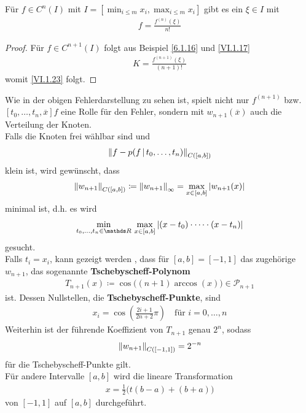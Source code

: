\begin{Fole}
  Für $f\in C^n(I) $ mit $I=[\min_{i\leq m}x_i, \max_{i\leq m}x_i]$
  gibt es ein $\xi\in I$ mit 
  \begin{gather}
    [t_0,\dots,t_n]f=\frac{f^{(n)}(\xi)}{n!}
    \label{VI.1.23}
  \end{gather}

  \begin{proof}
    Für $f\in C^{n+1}(I)$ folgt aus
    Beispiel \ref{6.1.16} und \eqref{VI.1.17}
    \begin{gather*}
      K= \frac{f^{(n+1)}(\xi)}{(n+1)!}
    \end{gather*}
    womit \eqref{VI.1.23} folgt.
  \end{proof}
\end{Fole}

Wie in der obigen Fehlerdarstellung zu sehen ist,
spielt nicht nur $f^{(n+1)}$ bzw.
$[t_0,\dots,t_n, \overline{x}]f$ eine Rolle für den Fehler,
sondern mit $w_{n+1}(\overline{x})$ auch die Verteilung der Knoten.\\
Falls die Knoten frei wählbar sind und
\begin{gather*}
  \left\| f-p(f\,|\,t_0,\dots,t_n) \right\|_{C([a,b])}
\end{gather*}
klein ist, wird gewünscht, dass
\begin{gather*}\index{Norm}
  \nn{w_{n+1}}_{C([a,b])}\coloneqq \nn{w_{n+1}}_\infty
  = \max_{x\in[a,b]}|w_{n+1}(x)|
\end{gather*}
minimal ist, d.h.
es wird 
\begin{gather*}
  \min_{t_0,\dots,t_n\in\R}\,\max_{x\in[a,b]}
  |(x-t_0)\cdot\dots\cdot(x-t_n)|
\end{gather*}
gesucht.\\
Falls $t_i=x_i$, kann gezeigt werden 
\cite[z.B.][]{deuflhardhohmann,freundhoppe},
dass für $[a,b]=[-1,1]$ das zugehörige $w_{n+1}$,
das sogenannte
\textbf{Tschebyscheff-Polynom}
\begin{gather}
  T_{n+1}(x)\coloneqq \cos\big((n+1)\arccos(x)\big)\in\mathcal{P}_{n+1}
  \label{VI.1.24}
\end{gather}
ist. Dessen Nullstellen, die 
\textbf{Tschebyscheff-Punkte},
sind
\begin{gather}
  x_i= \cos\left(\frac{2i+1}{2n+2}\pi\right)\quad \text{für } i=0,\dots,n
  \label{VI.1.25}
\end{gather}
Weiterhin ist der führende Koeffizient von $T_{n+1}$ genau $2^n$,
sodass 
\begin{gather}
  \left\| w_{n+1} \right\|_{C([-1,1])}=2^{-n}
  \label{VI.1.26}
\end{gather}
für die Tschebyscheff-Punkte gilt.\\
Für andere Intervalle $[a,b]$ wird die lineare Transformation
\begin{gather*}
  x=\frac{1}{2}\big(t(b-a)+(b+a)\big)
\end{gather*}
von $[-1,1]$ auf $[a,b]$ durchgeführt.

